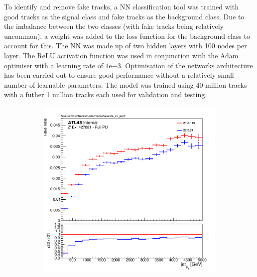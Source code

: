 To identify and remove fake tracks, a NN classification tool was trained with good tracks as the signal class and fake tracks as the background class.
Due to the imbalance between the two classes (with fake tracks being relatively uncommon), a weight was added to the loss function for the background class to account for this.
The NN was made up of two hidden layers with 100 nodes per layer. 
The ReLU activation function was used in conjunction with the Adam optimiser with a learning rate of $1\text{e}{-3}$.
Optimisation of the networks architecture has been carried out to ensure good performance without a relatively small number of learnable parameters.
The model was trained using \num{40} million tracks with a futher \num{1} million tracks each used for validation and testing.

\begin{figure}[!htbp]
  \centering
  \begin{subfigure}[b]{0.48\textwidth}
      \centering
      \includegraphics[width=\textwidth]{chapters/track_classifier/figs/fakerate_vs_pt.pdf}
  \end{subfigure}
  \quad
  \begin{subfigure}[b]{0.48\textwidth}
      \centering

\end{subfigure}
\end{figure}
